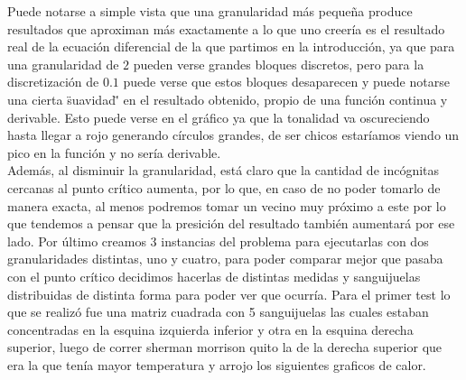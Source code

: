 Puede notarse a simple vista que una granularidad más pequeña produce resultados que aproximan más exactamente a lo que uno creería es el resultado real de la ecuación diferencial de la que partimos en la introducción, ya que para una granularidad de $2$ pueden verse grandes bloques discretos, pero para la discretización de $0.1$ puede verse que estos bloques desaparecen y puede notarse una cierta \"suavidad\"' en el resultado obtenido, propio de una función continua y derivable. Esto puede verse en el gráfico ya que la tonalidad va oscureciendo hasta llegar a rojo generando círculos grandes, de ser chicos estaríamos viendo un pico en la función y no sería derivable.
\\
Además, al disminuir la granularidad, está claro que la cantidad de incógnitas cercanas al punto crítico aumenta, por lo que, en caso de no poder tomarlo de manera exacta, al menos podremos tomar un vecino muy próximo a este por lo que tendemos a pensar que la presición del resultado también aumentará por ese lado.
Por último creamos 3 instancias del problema para ejecutarlas con dos granularidades distintas, uno y cuatro, para poder comparar mejor que pasaba con el punto crítico decidimos hacerlas de distintas medidas y sanguijuelas distribuidas de distinta forma para poder ver que ocurría.
Para el primer test lo que se realizó fue una matriz cuadrada con 5 sanguijuelas las cuales estaban concentradas en la esquina izquierda inferior y otra en la esquina derecha superior, luego de correr sherman morrison quito la de la derecha superior que era la que tenía mayor temperatura y arrojo los siguientes graficos de calor.

